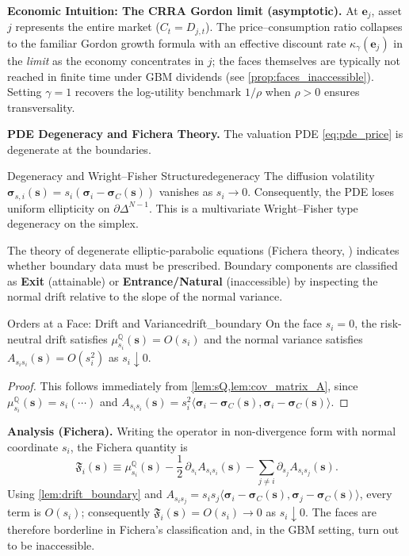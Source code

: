 \documentclass[11pt,letterpaper,oneside]{article}
\numberwithin{equation}{section}
\newcommand{\1}{\mathbf{1}}
\begin{document}
\begin{tcolorbox}[didacticstyle]
  	\textbf{Economic Intuition: The CRRA Gordon limit (asymptotic).} At $\bm{e}_j$, asset $j$ represents the entire market ($C_t = D_{j,t}$). The price--consumption ratio collapses to the familiar Gordon growth formula with an effective discount rate $\kappa_\gamma(\bm{e}_j)$ in the \emph{limit} as the economy concentrates in $j$; the faces themselves are typically not reached in finite time under GBM dividends (see \cref{prop:faces_inaccessible}). Setting $\gamma=1$ recovers the log-utility benchmark $1/\rho$ when $\rho>0$ ensures transversality.

\begin{tcolorbox}[mathstyle]
  	\textbf{PDE Degeneracy and Fichera Theory.} The valuation PDE \eqref{eq:pde_price} is degenerate at the boundaries.

    \begin{definition}{Degeneracy and Wright--Fisher Structure}{degeneracy}
    The diffusion volatility $\bm{\sigma}_{s,i}(\bm{s}) = s_i (\bm{\sigma}_i - \bm{\sigma}_C(\bm{s}))$ vanishes as $s_i \to 0$. Consequently, the PDE loses uniform ellipticity on $\partial\Delta^{N-1}$. This is a multivariate Wright--Fisher type degeneracy on the simplex.
    \end{definition}

    The theory of degenerate elliptic-parabolic equations (Fichera theory, \cite{fichera1960}) indicates whether boundary data must be prescribed. Boundary components are classified as \textbf{Exit} (attainable) or \textbf{Entrance/Natural} (inaccessible) by inspecting the normal drift relative to the slope of the normal variance.

    \begin{lemma}{Orders at a Face: Drift and Variance}{drift_boundary}
    On the face $s_i=0$, the risk-neutral drift satisfies $\mu_{s_i}^{\mathbb{Q}}(\bm{s}) = O(s_i)$ and the normal variance satisfies $A_{s_i s_i}(\bm{s}) = O(s_i^2)$ as $s_i \downarrow 0$.
    \end{lemma}
    \begin{proof}
    This follows immediately from \cref{lem:sQ,lem:cov_matrix_A}, since $\mu_{s_i}^{\mathbb{Q}}(\bm{s}) = s_i(\cdots)$ and $A_{s_i s_i}(\bm{s}) = s_i^2 \langle\bm{\sigma}_i - \bm{\sigma}_C(\bm{s}), \bm{\sigma}_i - \bm{\sigma}_C(\bm{s})\rangle$.
    \end{proof}

  		\textbf{Analysis (Fichera).} Writing the operator in non-divergence form with normal coordinate $s_i$, the Fichera quantity is
      \[
        \mathfrak{F}_i(\bm{s}) \equiv \mu_{s_i}^{\mathbb{Q}}(\bm{s}) - \frac12\,\partial_{s_i}A_{s_i s_i}(\bm{s}) - \sum_{j\neq i}\partial_{s_j}A_{s_i s_j}(\bm{s}).
      \]
      Using \cref{lem:drift_boundary} and $A_{s_i s_j} = s_i s_j \langle\bm{\sigma}_i - \bm{\sigma}_C(\bm{s}), \bm{\sigma}_j - \bm{\sigma}_C(\bm{s})\rangle$, every term is $O(s_i)$; consequently $\mathfrak{F}_i(\bm{s}) = O(s_i) \to 0$ as $s_i \downarrow 0$. The faces are therefore borderline in Fichera's classification and, in the GBM setting, turn out to be inaccessible.


\end{tcolorbox}
\end{tcolorbox}
\end{document}
